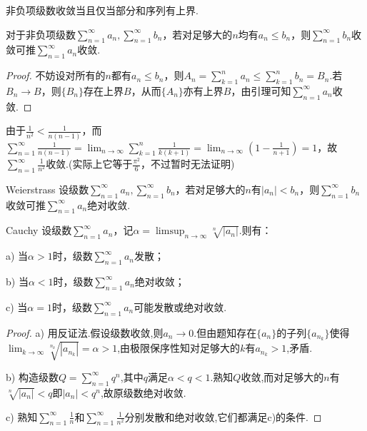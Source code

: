 \begin{lemma}{}
	非负项级数收敛当且仅当部分和序列有上界.
\end{lemma}

\begin{proposition}{}
	对于非负项级数$\sum_{n=1}^{\infty} a_n,\sum_{n=1}^{\infty} b_n$，若对足够大的$n$均有$a_n \leq b_n$，则$\sum_{n=1}^{\infty} b_n$收敛可推$\sum_{n=1}^{\infty} a_n$收敛.
\end{proposition}
\begin{proof}
	不妨设对所有的$n$都有$a_n \leq b_n$，则$A_n = \sum_{k=1}^{n} a_n \leq \sum_{k=1}^n b_n = B_n$.若$B_n \to B$，则$\{ B_n \}$存在上界$B$，从而$\{ A_n \}$亦有上界$B$，由引理可知$\sum_{n=1}^{\infty} a_n$收敛.
\end{proof}

\begin{example}
	由于$\frac{1}{n^2}<\frac{1}{n(n-1)}$，而$\sum_{n=1}^{\infty}\frac{1}{n(n-1)} = \lim_{n\to \infty} \sum_{k=1}^{n} \frac{1}{k(k+1)} = \lim_{n\to \infty} (1-\frac{1}{n+1})=1$，故$\sum_{n=1}^{\infty} \frac{1}{n^2}$收敛.(实际上它等于$\frac{\pi ^2}{6}$，不过暂时无法证明)
\end{example}

\begin{corollary}{Weierstrass}
	设级数$\sum_{n=1}^{\infty} a_n,\sum_{n=1}^{\infty} b_n$，若对足够大的$n$有$|a_n|<b_n$，则$\sum_{n=1}^{\infty} b_n$收敛可推$\sum_{n=1}^{\infty} a_n$绝对收敛.
\end{corollary}

\begin{corollary}{Cauchy}
	设级数$\sum_{n=1}^{\infty} a_n$，记$\alpha = \limsup_{n\to \infty} \sqrt[n]{|a_n|}$.则有：
	
	a) 当$\alpha >1$时，级数$\sum_{n=1}^{\infty} a_n$发散；
	
	b) 当$\alpha <1$时，级数$\sum_{n=1}^{\infty} a_n$绝对收敛；
	
	c) 当$\alpha =1$时，级数$\sum_{n=1}^{\infty} a_n$可能发散或绝对收敛.
\end{corollary}
\begin{proof}
	a) 用反证法.假设级数收敛,则$a_n \to 0$.但由题知存在$\{ a_n \}$的子列$\{ a_{n_k} \}$使得$\lim_{k\to \infty} \sqrt[n_k]{|a_{n_k}|} = \alpha > 1$,由极限保序性知对足够大的$k$有$a_{n_k}>1$,矛盾.
	
	b) 构造级数$Q=\sum_{n=1}^{\infty} q^n$,其中$q$满足$\alpha < q <1$.熟知$Q$收敛,而对足够大的$n$有$\sqrt[n]{|a_n|}<q$即$|a_n|<q^n$,故原级数绝对收敛.
	
	c) 熟知$\sum_{n=1}^{\infty} \frac{1}{n}$和$\sum_{n=1}^{\infty} \frac{1}{n^2}$分别发散和绝对收敛,它们都满足c)的条件.
\end{proof}

